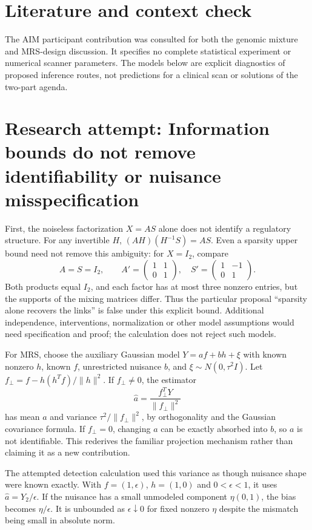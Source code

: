 \documentclass[11pt]{article}
\begin{document}
\section{Literature and context check}
The AIM participant contribution was consulted for both the genomic
mixture and MRS-design discussion. It specifies no complete statistical
experiment or numerical scanner parameters. The models below are explicit
diagnostics of proposed inference routes, not predictions for a clinical scan
or solutions of the two-part agenda.
\section{Research attempt: Information bounds do not remove identifiability or nuisance misspecification}
First, the noiseless factorization $X=AS$ alone does not identify a regulatory
structure. For any invertible $H$, $(AH)(H^{-1}S)=AS$. Even a sparsity upper
bound need not remove this ambiguity: for $X=I_2$, compare
\[
 A=S=I_2,\qquad
 A'=\begin{pmatrix}1&1\\0&1\end{pmatrix},\quad
 S'=\begin{pmatrix}1&-1\\0&1\end{pmatrix}.
\]
Both products equal $I_2$, and each factor has at most three nonzero entries,
but the supports of the mixing matrices differ. Thus the particular proposal
``sparsity alone recovers the links'' is false under this explicit bound.
Additional independence, interventions, normalization or other model assumptions
would need specification and proof; the calculation does not reject such models.

For MRS, choose the auxiliary Gaussian model $Y=af+bh+\xi$ with known
nonzero $h$, known $f$, unrestricted nuisance $b$, and
$\xi\sim N(0,\tau^2 I)$. Let
$f_\perp=f-h(h^Tf)/\|h\|^2$. If $f_\perp\ne0$, the estimator
\[
 \widehat a=\frac{f_\perp^TY}{\|f_\perp\|^2}
\]
has mean $a$ and variance $\tau^2/\|f_\perp\|^2$, by orthogonality and the
Gaussian covariance formula. If $f_\perp=0$, changing $a$ can be exactly
absorbed into $b$, so $a$ is not identifiable. This rederives the familiar
projection mechanism rather than claiming it as a new contribution.

The attempted detection calculation used this variance as though nuisance
shape were known exactly. With $f=(1,\epsilon)$, $h=(1,0)$ and
$0<\epsilon<1$, it uses $\widehat a=Y_2/\epsilon$. If the nuisance has a
small unmodeled component $\eta(0,1)$, the bias becomes $\eta/\epsilon$.
It is unbounded as $\epsilon\downarrow0$ for fixed nonzero $\eta$ despite
the mismatch being small in absolute norm.
\end{document}
